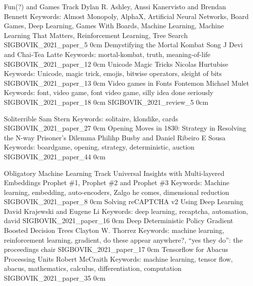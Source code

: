 \renewcommand{\thepage}{\roman{page}}
\setcounter{page}{3}

\newpage
\renewcommand{\thepage}{\arabic{page}}
\setcounter{page}{1}

\newcommand{\link}[2][]{\vspace{-1in} {\scriptsize #1 \url{#2}} \raisebox{-0.5\height}{\texttt{[image: participation]}}}

\addtrack
    {}{Fun(?) and Games Track}
    {Dylan R. Ashley, Anssi Kanervisto and Brendan Bennett}
    {Keywords: Almost Monopoly, AlphaX, Artificial Neural Networks, Board Games, Deep Learning, Games With Boards, Machine Learning, Machine Learning That Matters, Reinforcement Learning, Tree Search}
    {SIGBOVIK_2021_paper_5}
    {0cm}
    {}
\addpaper
    {Demystifying the Mortal Kombat Song}
    {J Devi and Chai-Tea Latte}
    {Keywords: mortal-kombat, truth, meaning-of-life}
    {SIGBOVIK_2021_paper_12}
    {0cm}
    {}
\addpaper
    {Unicode Magic Tricks}
    {Nicolas Hurtubise}
    {Keywords: Unicode, magic trick, emojis, bitwise operators, sleight of bits}
    {SIGBOVIK_2021_paper_13}
    {0cm}
    {}
\addpaper
    {Video games in Fonts Fontemon}
    {Michael Mulet}
    {Keywords: font, video game, font video game, silly idea done seriously}
    {SIGBOVIK_2021_paper_18}
    {0cm}
    {}
\addreview
    {SIGBOVIK_2021_review_5}
    {0cm}

\addpaper
    {Soliterrible}
    {Sam Stern}
    {Keywords: solitaire, klondike, cards}
    {SIGBOVIK_2021_paper_27}
    {0cm}
    {}
\addpaper
    {Opening Moves in 1830: Strategy in Resolving the N-way Prisoner’s Dilemma}
    {Philihp Busby and Daniel Ribeiro E Sousa}
    {Keywords: boardgame, opening, strategy, deterministic, auction}
    {SIGBOVIK_2021_paper_44}
    {0cm}
    {}

\addtrack
    {}{Obligatory Machine Learning Track}
\addpaper
    {Universal Insights with Multi-layered Embeddings}
    {Prophet \#1, Prophet \#2 and Prophet \#3}
    {Keywords: Machine learning, embedding, auto-encoders, Zalgo he comes, dimensional reduction}
    {SIGBOVIK_2021_paper_8}
    {0cm}
    {}
\addpaper
    {Solving reCAPTCHA v2 Using Deep Learning}
    {David Krajewski and Eugene Li}
    {Keywords: deep learning, recaptcha, automation, david}
    {SIGBOVIK_2021_paper_16}
    {0cm}
    {}
\addpaper
    {Deep Deterministic Policy Gradient Boosted Decision Trees}
    {Clayton W. Thorrez}
    {Keywords: machine learning, reinforcement learning, gradient, do these appear anywhere?, ``yes they do'': the proceedings chair}
    {SIGBOVIK_2021_paper_17}
    {0cm}
    {}
\addpaper
    {Tensorflow for Abacus Processing Units}
    {Robert McCraith}
    {Keywords: machine learning, tensor flow, abacus, mathematics, calculus, differentiation, computation}
    {SIGBOVIK_2021_paper_35}
    {0cm}
    {}


